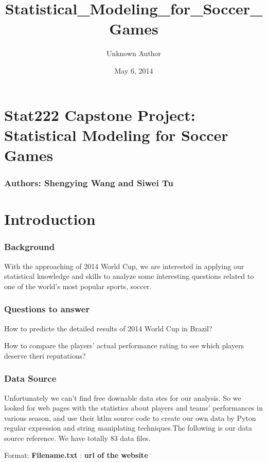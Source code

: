 \documentclass[letterpaper,10pt,english]{/usr/local/lib/python2.7/dist-packages/sphinx/texinputs/sphinxhowto}
\title{Statistical\_Modeling\_for\_Soccer\_Games}
\date{May 6, 2014}
\author{Unknown Author}
\begin{document}
        
            \maketitle
        

        


        
        \part{Stat222 Capstone Project: Statistical Modeling for Soccer Games}\section{Authors: Shengying Wang and Siwei Tu}\part{Introduction}\section{Background}With the approaching of 2014 World Cup, we are interested in applying
our statistical knowledge and skills to analyze some interesting
questions related to one of the world's most popular sports, soccer.\section{Questions to answer}How to predicte the detailed results of 2014 World Cup in Brazil?

How to compare the players' actual performance rating to see which
players deserve theri reputations?\section{Data Source}Unfortunately we can't find free downable data stes for our analysis. So
we looked for web pages with the statistics about players and teams'
performances in various season, and use their htlm source code to create
our own data by Pyton regular expression and string maniplating
techniques.The following is our data source reference. We have totally 83 data
files.

Format: \textbf{Filename.txt} : \textbf{url of the website}

\end{document}
